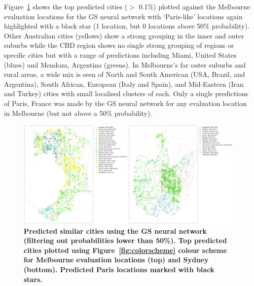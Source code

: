\documentclass[Crown,sageh,times]{sagej}
\begin{document}
Figure~\ref{fig:melsat} shows the top predicted cities ($>$ 0.1\%) plotted against the Melbourne evaluation locations for the GS neural network with `Paris-like' locations again highlighted with a black star (1 location, but 0 locations above 50\% probability). Other Australian cities (yellows) show a strong grouping in the inner and outer suburbs while the CBD region shows no single strong grouping of regions or specific cities but with a range of predictions including Miami, United States (blues) and Mendoza, Argentina (greens). In Melbourne's far outer suburbs and rural areas, a wide mix is seen of North and South American (USA, Brazil, and Argentina), South African, European (Italy and Spain), and Mid-Eastern (Iran and Turkey) cities with small localised clusters of each. Only a single predictions of Paris, France was made by the GS neural network for any evaluation location in Melbourne (but not above a 50\% probability).




\begin{figure}[!htbp]
\centering   
\includegraphics[scale=0.10]{Images/Figure5GS.png}  
\caption{ \bf Predicted similar cities using the GS neural network (filtering out probabilities lower than 50\%). Top predicted cities plotted using Figure~\ref{fig:colorscheme} colour scheme for Melbourne evaluation locations (top) and Sydney (bottom). Predicted Paris locations marked with black stars.}    
 \label{fig:melsat}  
\end{figure} 
\end{document}
